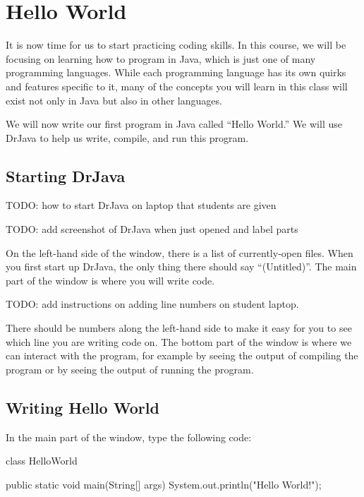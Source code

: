 \chapter{Hello World}

It is now time for us to start practicing coding skills.
In this course, we will be focusing on learning how to program
in Java, which is just one of many programming languages.
While each programming language has its own quirks and features
specific to it, many of the concepts you will learn in this
class will exist not only in Java but also in other languages.

We will now write our first program in Java called ``Hello World.''
We will use DrJava to help us write, compile, and run this program.

\section{Starting DrJava}
TODO: how to start DrJava on laptop that students are given

TODO: add screenshot of DrJava when just opened and label parts


On the left-hand side of the window, there is a list of currently-open files. When you first start up DrJava, the only thing there should say ``(Untitled)''.
The main part of the window is where you will write code.

TODO: add instructions on adding line numbers on student laptop.

There should be numbers along the left-hand side to make it easy for you to see which line you are writing code on. The bottom part of the window is where we can interact with the program, for example by seeing the output of compiling the program or by seeing the output of running the program.

\section{Writing Hello World}

In the main part of the window, type the following code:
\begin{code}
class HelloWorld {
    
    public static void main(String[] args) {
        System.out.println("Hello World!");
    }
    
}
\end{code}

